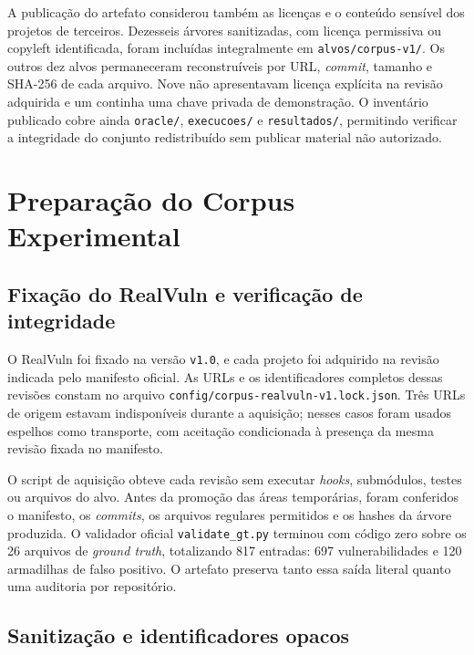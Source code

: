 A publicação do artefato considerou também as licenças e o conteúdo sensível dos projetos de terceiros. Dezesseis árvores sanitizadas, com licença permissiva ou copyleft identificada, foram incluídas integralmente em \texttt{alvos/corpus-v1/}. Os outros dez alvos permaneceram reconstruíveis por URL, \textit{commit}, tamanho e SHA-256 de cada arquivo. Nove não apresentavam licença explícita na revisão adquirida e um continha uma chave privada de demonstração. O inventário publicado cobre ainda \texttt{oracle/}, \texttt{execucoes/} e \texttt{resultados/}, permitindo verificar a integridade do conjunto redistribuído sem publicar material não autorizado.

\section{Preparação do Corpus Experimental}\label{sec:preparacao-corpus}

\subsection{Fixação do RealVuln e verificação de integridade}\label{subsec:fixacao-realvuln}

O RealVuln foi fixado na versão \texttt{v1.0}, e cada projeto foi adquirido na revisão indicada pelo manifesto oficial. As URLs e os identificadores completos dessas revisões constam no arquivo \texttt{config/corpus-realvuln-v1.lock.json}. Três URLs de origem estavam indisponíveis durante a aquisição; nesses casos foram usados espelhos como transporte, com aceitação condicionada à presença da mesma revisão fixada no manifesto.

O script de aquisição obteve cada revisão sem executar \textit{hooks}, submódulos, testes ou arquivos do alvo. Antes da promoção das áreas temporárias, foram conferidos o manifesto, os \textit{commits}, os arquivos regulares permitidos e os hashes da árvore produzida. O validador oficial \texttt{validate\_gt.py} terminou com código zero sobre os 26 arquivos de \textit{ground truth}, totalizando 817 entradas: 697 vulnerabilidades e 120 armadilhas de falso positivo. O artefato preserva tanto essa saída literal quanto uma auditoria por repositório.

\subsection{Sanitização e identificadores opacos}\label{subsec:sanitizacao-alvos}

